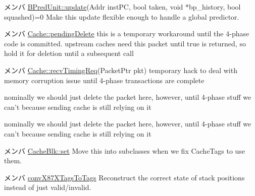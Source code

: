\label{todo__todo000048}
\hypertarget{todo__todo000048}{}
 
\begin{DoxyDescription}
\item[メンバ \hyperlink{classBPredUnit_ab00dd76dc9f830cdae0edc72357c013a}{BPredUnit::update}(Addr instPC, bool taken, void $\ast$bp\_\-history, bool squashed)=0 ]Make this update flexible enough to handle a global predictor. 
\end{DoxyDescription}

\label{todo__todo000074}
\hypertarget{todo__todo000074}{}
 
\begin{DoxyDescription}
\item[メンバ \hyperlink{classCache_a21da4bea3554874b557428e4cce5d4a4}{Cache::pendingDelete} ]this is a temporary workaround until the 4-\/phase code is committed. upstream caches need this packet until true is returned, so hold it for deletion until a subsequent call 
\end{DoxyDescription}

\label{todo__todo000075}
\hypertarget{todo__todo000075}{}
 
\begin{DoxyDescription}
\item[メンバ \hyperlink{classCache_a3344d9dd0f83257feab5424e761f31c6}{Cache::recvTimingReq}(PacketPtr pkt) ]temporary hack to deal with memory corruption issue until 4-\/phase transactions are complete 

nominally we should just delete the packet here, however, until 4-\/phase stuff we can't because sending cache is still relying on it 

nominally we should just delete the packet here, however, until 4-\/phase stuff we can't because sending cache is still relying on it 
\end{DoxyDescription}

\label{todo__todo000073}
\hypertarget{todo__todo000073}{}
 
\begin{DoxyDescription}
\item[メンバ \hyperlink{classCacheBlk_abc95fb2bad5b94ceca590f7dacd269b5}{CacheBlk::set} ]Move this into subclasses when we fix CacheTags to use them. 
\end{DoxyDescription}

\label{todo__todo000005}
\hypertarget{todo__todo000005}{}
 
\begin{DoxyDescription}
\item[メンバ \hyperlink{namespaceX86ISA_ae196a751ba59507ee189f66f87f62de1}{convX87XTagsToTags} ]Reconstruct the correct state of stack positions instead of just valid/invalid.


\end{DoxyDescription}

